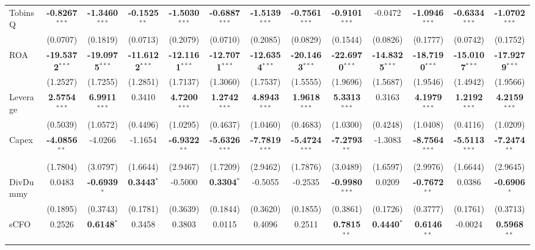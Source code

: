 \documentclass[11pt,a4paper]{article}
\begin{document}
\begin{table}[htbp]
\begin{tabular}{lcccccccccccc}
TobinsQ & \textbf{-0.8267}$^{***}$ & \textbf{-1.3460}$^{***}$ & \textbf{-0.1525}$^{**}$ & \textbf{-1.5030}$^{***}$ & \textbf{-0.6887}$^{***}$ & \textbf{-1.5139}$^{***}$ & \textbf{-0.7561}$^{***}$ & \textbf{-0.9101}$^{***}$ & -0.0472 & \textbf{-1.0946}$^{***}$ & \textbf{-0.6334}$^{***}$ & \textbf{-1.0702}$^{***}$ \\
 & (0.0707) & (0.1819) & (0.0713) & (0.2079) & (0.0710) & (0.2085) & (0.0829) & (0.1544) & (0.0826) & (0.1777) & (0.0742) & (0.1752) \\
ROA & \textbf{-19.5372}$^{***}$ & \textbf{-19.0975}$^{***}$ & \textbf{-11.6122}$^{***}$ & \textbf{-12.1161}$^{***}$ & \textbf{-12.7071}$^{***}$ & \textbf{-12.6354}$^{***}$ & \textbf{-20.1463}$^{***}$ & \textbf{-22.6970}$^{***}$ & \textbf{-14.8325}$^{***}$ & \textbf{-18.7190}$^{***}$ & \textbf{-15.0107}$^{***}$ & \textbf{-17.9279}$^{***}$ \\
 & (1.2527) & (1.7255) & (1.2851) & (1.7137) & (1.3060) & (1.7537) & (1.5555) & (1.9696) & (1.5687) & (1.9546) & (1.4942) & (1.9566) \\
Leverage & \textbf{2.5754}$^{***}$ & \textbf{6.9911}$^{***}$ & 0.3410 & \textbf{4.7200}$^{***}$ & \textbf{1.2742}$^{***}$ & \textbf{4.8943}$^{***}$ & \textbf{1.9618}$^{***}$ & \textbf{5.3313}$^{***}$ & 0.3163 & \textbf{4.1979}$^{***}$ & \textbf{1.2192}$^{***}$ & \textbf{4.2159}$^{***}$ \\
 & (0.5039) & (1.0572) & (0.4496) & (1.0295) & (0.4637) & (1.0460) & (0.4683) & (1.0300) & (0.4248) & (1.0408) & (0.4116) & (1.0209) \\
Capex & \textbf{-4.0856}$^{**}$ & -4.0266 & -1.1654 & \textbf{-6.9322}$^{**}$ & \textbf{-5.6326}$^{***}$ & \textbf{-7.7819}$^{***}$ & \textbf{-5.4724}$^{***}$ & \textbf{-7.2793}$^{**}$ & -1.3083 & \textbf{-8.7564}$^{***}$ & \textbf{-5.5113}$^{***}$ & \textbf{-7.2474}$^{**}$ \\
 & (1.7804) & (3.0797) & (1.6644) & (2.9467) & (1.7209) & (2.9462) & (1.7876) & (3.0489) & (1.6597) & (2.9976) & (1.6644) & (2.9645) \\
DivDummy & 0.0483 & \textbf{-0.6939}$^{*}$ & \textbf{0.3443}$^{*}$ & -0.5000 & \textbf{0.3304}$^{*}$ & -0.5055 & -0.2535 & \textbf{-0.9980}$^{***}$ & 0.0209 & \textbf{-0.7672}$^{**}$ & 0.0386 & \textbf{-0.6906}$^{*}$ \\
 & (0.1895) & (0.3743) & (0.1781) & (0.3639) & (0.1844) & (0.3620) & (0.1855) & (0.3861) & (0.1726) & (0.3777) & (0.1761) & (0.3713) \\
sCFO & 0.2526 & \textbf{0.6148}$^{*}$ & 0.3458 & 0.3803 & 0.0115 & 0.4096 & 0.2511 & \textbf{0.7815}$^{**}$ & \textbf{0.4440}$^{*}$ & \textbf{0.6146}$^{**}$ & -0.0024 & \textbf{0.5968}$^{**}$ \\

\end{tabular}
\end{table}
\end{document}
